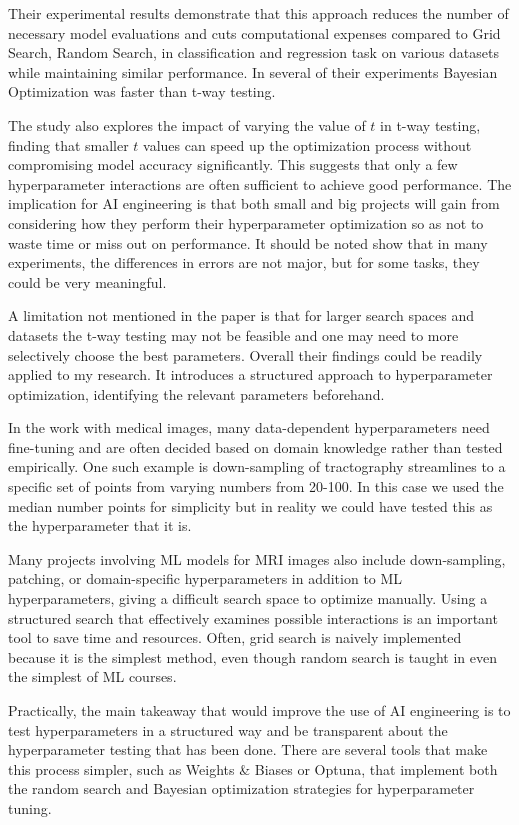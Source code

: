 \documentclass[a4paper, 11pt]{article}
\begin{document}
Their experimental results demonstrate that this approach reduces the number of necessary model evaluations and cuts computational expenses compared to Grid Search, Random Search, in classification and regression task on various datasets while maintaining similar performance. In several of their experiments Bayesian Optimization was faster than t-way testing. 

The study also explores the impact of varying the value of $t$ in t-way testing, finding that smaller $t$ values can speed up the optimization process without compromising model accuracy significantly. This suggests that only a few hyperparameter interactions are often sufficient to achieve good performance. The implication for AI engineering is that both small and big projects will gain from considering how they perform their hyperparameter optimization so as not to waste time or miss out on performance. It should be noted show that in many experiments, the differences in errors are not major, but for some tasks, they could be very meaningful. 

A limitation not mentioned in the paper is that for larger search spaces and datasets the t-way testing may not be feasible and one may need to more selectively choose the best parameters. Overall their findings could be readily applied to my research. It introduces a structured approach to hyperparameter optimization, identifying the relevant parameters beforehand. 

In the work with medical images, many data-dependent hyperparameters need fine-tuning and are often decided based on domain knowledge rather than tested empirically. One such example is down-sampling of tractography streamlines to a specific set of points from varying numbers from 20-100. In this case we used the median number points for simplicity but in reality we could have tested this as the hyperparameter that it is.  

Many projects involving ML models for MRI images also include down-sampling, patching, or domain-specific hyperparameters in addition to ML hyperparameters, giving a difficult search space to optimize manually. Using a structured search that effectively examines possible interactions is an important tool to save time and resources. Often, grid search is naively implemented because it is the simplest method, even though random search is taught in even the simplest of ML courses.  

Practically, the main takeaway that would improve the use of AI engineering is to test hyperparameters in a structured way and be transparent about the hyperparameter testing that has been done. There are several tools that make this process simpler, such as Weights \& Biases or Optuna, that implement both the random search and Bayesian optimization strategies for hyperparameter tuning.




\printbibliography
\end{document}
